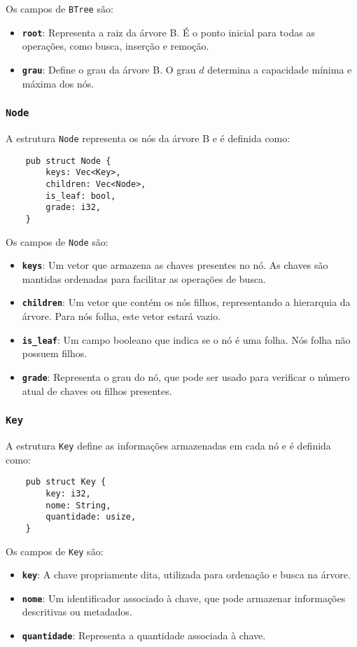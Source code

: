Os campos de \texttt{BTree} são:
\begin{itemize}
    \item \textbf{\texttt{root}}: Representa a raiz da árvore B. É o ponto inicial para 
    todas as operações, como busca, inserção e remoção.
    \item \textbf{\texttt{grau}}: Define o grau da árvore B. O grau \( d \) determina a 
    capacidade mínima e máxima dos nós.
\end{itemize}

\subsubsection{\texttt{Node}}

A estrutura \texttt{Node} representa os nós da árvore B e é definida como:

\begin{lstlisting}
    pub struct Node {
        keys: Vec<Key>,
        children: Vec<Node>,
        is_leaf: bool,
        grade: i32,
    }
\end{lstlisting}

Os campos de \texttt{Node} são:
\begin{itemize}
    \item \textbf{\texttt{keys}}: Um vetor que armazena as chaves presentes no nó. 
    As chaves são mantidas ordenadas para facilitar as operações de busca.
    \item \textbf{\texttt{children}}: Um vetor que contém os nós filhos, representando 
    a hierarquia da árvore. Para nós folha, este vetor estará vazio.
    \item \textbf{\texttt{is\_leaf}}: Um campo booleano que indica se o nó é uma folha. 
    Nós folha não possuem filhos.
    \item \textbf{\texttt{grade}}: Representa o grau do nó, que pode ser usado para verificar 
    o número atual de chaves ou filhos presentes.
\end{itemize}

\subsubsection{\texttt{Key}}

A estrutura \texttt{Key} define as informações armazenadas em cada nó e é definida como:

\begin{lstlisting}
    pub struct Key {
        key: i32,
        nome: String,
        quantidade: usize,
    }
\end{lstlisting}

Os campos de \texttt{Key} são:
\begin{itemize}
    \item \textbf{\texttt{key}}: A chave propriamente dita, utilizada para ordenação e busca na árvore.
    \item \textbf{\texttt{nome}}: Um identificador associado à chave, que pode armazenar 
    informações descritivas ou metadados.
    \item \textbf{\texttt{quantidade}}: Representa a quantidade associada à chave.
\end{itemize}
